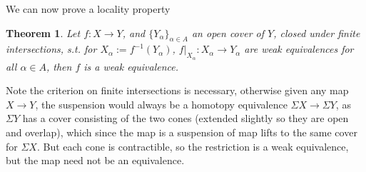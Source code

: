 \documentclass{article}
\newtheorem{theorem}{Theorem}[section]
\newtheorem{proposed work}[theorem]{Proposed Work}
\begin{document}
We can now prove a locality property
\begin{theorem} \label{Thm:LocalWeak}
Let $f:X\to Y$, and $\{Y_\alpha\}_{\alpha \in A}$ an open cover of $Y$, closed under finite intersections, s.t. for $X_\alpha:=f^{-1}(Y_\alpha)$, $f|_{X_\alpha}: X_{\alpha} \to Y_{\alpha}$ are weak equivalences for all $\alpha \in A$, then $f$ is a weak equivalence.
\end{theorem}

Note the criterion on finite intersections is necessary, otherwise given any map $X\to Y$, the suspension would always be a homotopy equivalence $\Sigma X \to \Sigma Y$, as $\Sigma Y$ has a cover consisting of the two cones (extended slightly so they are open and overlap), which since the map is a suspension of map lifts to the same cover for $\Sigma X$. But each cone is contractible, so the restriction is a weak equivalence, but the map need not be an equivalence.
\end{document}

